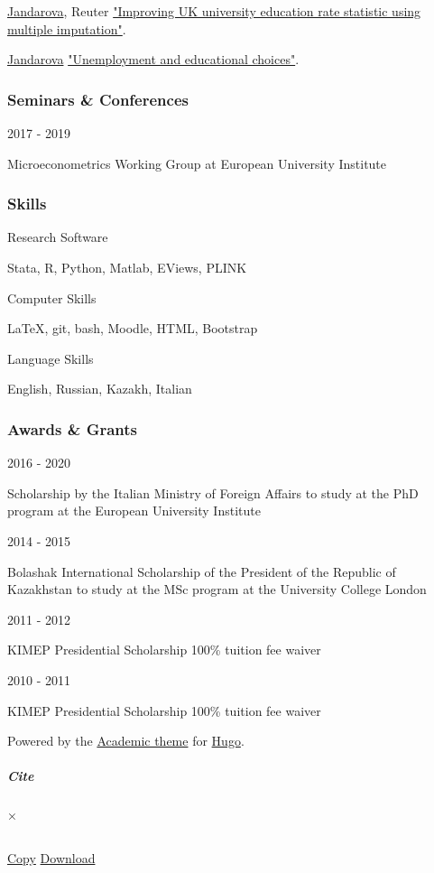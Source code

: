 \documentclass[
  american,
]{article}
\begin{document}
{ {\href{/authors/admin/}{Jandarova}}, {Reuter} }
\href{/publication/work-in-progress/measurement-edu-uk/}{"Improving UK
university education rate statistic using multiple imputation"}.

{ {\href{/authors/admin/}{Jandarova}} }
\href{/publication/work-in-progress/edu-unemp/}{"Unemployment and
educational choices"}.

\hypertarget{seminars}{}
\hypertarget{seminars-conferences}{%
\subsubsection{Seminars \& Conferences}\label{seminars-conferences}}

2017 - 2019

Microeconometrics Working Group at European University Institute

\hypertarget{skills}{}
\hypertarget{skills}{%
\subsubsection{Skills}\label{skills}}

Research Software

Stata, R, Python, Matlab, EViews, PLINK

Computer Skills

LaTeX, git, bash, Moodle, HTML, Bootstrap

Language Skills

English, Russian, Kazakh, Italian

\hypertarget{accomplishments}{}
\hypertarget{awards-grants}{%
\subsubsection{Awards \& Grants}\label{awards-grants}}

2016 - 2020

Scholarship by the Italian Ministry of Foreign Affairs to study at the
PhD program at the European University Institute

2014 - 2015

Bolashak International Scholarship of the President of the Republic of
Kazakhstan to study at the MSc program at the University College London

2011 - 2012

KIMEP Presidential Scholarship 100\% tuition fee waiver

2010 - 2011

KIMEP Presidential Scholarship 100\% tuition fee waiver

Powered by the \href{https://sourcethemes.com/academic/}{Academic theme}
for \href{https://gohugo.io}{Hugo}. { \protect\hyperlink{}{{ \emph{} }}
}

\hypertarget{modal}{}
\hypertarget{cite}{%
\subparagraph{Cite}\label{cite}}

{×}

\begin{verbatim}
\end{verbatim}

\protect\hyperlink{}{\emph{} Copy} \protect\hyperlink{}{\emph{}
Download}

\hypertarget{modal-error}{}
\end{document}
